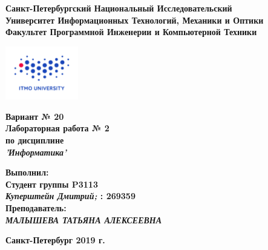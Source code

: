 \documentclass[11pt]{article}
\author{АВТОР}
\date{\today}
\title{}
\begin{document}
\large
\thispagestyle{empty}
\begin{center}
\textbf{Санкт-Петербургский Национальный Исследовательский}\\
\textbf{Университет Информационных Технологий, Механики и Оптики}\\
\textbf{Факультет Программной Инженерии и Компьютерной Техники}\\
\end{center}
\vspace{1em}
\begin{center}
\includegraphics[width=120px]{../../itmo-logo.png}
\end{center}
\LARGE
\vspace{5em}
\begin{center}
\textbf{Вариант № 20}\\
\textbf{Лабораторная работа № 2}\\
\Large
\textbf{по дисциплине}\\
\LARGE
\textbf{\emph{'Информатика'}}\\
\end{center}
\vspace{11em}
\large
\begin{flushright}
\textbf{Выполнил:}\\
\textbf{Студент группы P3113}\\
\textbf{\emph{Куперштейн Дмитрий;} : 269359}\\
\textbf{Преподаватель:}\\
\textbf{\emph{МАЛЫШЕВА ТАТЬЯНА АЛЕКСЕЕВНА}}\\
\end{flushright}
\vspace{4em}
\large
\begin{center}
\textbf{Санкт-Петербург 2019 г.}
\end{center}
\pagebreak{}
\setcounter{tocdepth}{2}
\tableofcontents
\vspace{2em}
\pagebreak{}
\end{document}
